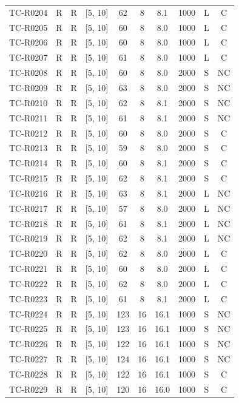 \begin{longtable}{lccccccccc}
TC-R0204 & R & R & [5, 10] & 62 & 8 & 8.1 & 1000 & L & C \\
TC-R0205 & R & R & [5, 10] & 60 & 8 & 8.0 & 1000 & L & C \\
TC-R0206 & R & R & [5, 10] & 60 & 8 & 8.0 & 1000 & L & C \\
TC-R0207 & R & R & [5, 10] & 61 & 8 & 8.0 & 1000 & L & C \\
TC-R0208 & R & R & [5, 10] & 60 & 8 & 8.0 & 2000 & S & NC \\
TC-R0209 & R & R & [5, 10] & 63 & 8 & 8.0 & 2000 & S & NC \\
TC-R0210 & R & R & [5, 10] & 62 & 8 & 8.1 & 2000 & S & NC \\
TC-R0211 & R & R & [5, 10] & 61 & 8 & 8.1 & 2000 & S & NC \\
TC-R0212 & R & R & [5, 10] & 60 & 8 & 8.0 & 2000 & S & C \\
TC-R0213 & R & R & [5, 10] & 59 & 8 & 8.0 & 2000 & S & C \\
TC-R0214 & R & R & [5, 10] & 60 & 8 & 8.1 & 2000 & S & C \\
TC-R0215 & R & R & [5, 10] & 62 & 8 & 8.1 & 2000 & S & C \\
TC-R0216 & R & R & [5, 10] & 63 & 8 & 8.1 & 2000 & L & NC \\
TC-R0217 & R & R & [5, 10] & 57 & 8 & 8.0 & 2000 & L & NC \\
TC-R0218 & R & R & [5, 10] & 61 & 8 & 8.1 & 2000 & L & NC \\
TC-R0219 & R & R & [5, 10] & 62 & 8 & 8.1 & 2000 & L & NC \\
TC-R0220 & R & R & [5, 10] & 62 & 8 & 8.0 & 2000 & L & C \\
TC-R0221 & R & R & [5, 10] & 60 & 8 & 8.0 & 2000 & L & C \\
TC-R0222 & R & R & [5, 10] & 62 & 8 & 8.0 & 2000 & L & C \\
TC-R0223 & R & R & [5, 10] & 61 & 8 & 8.1 & 2000 & L & C \\
TC-R0224 & R & R & [5, 10] & 123 & 16 & 16.1 & 1000 & S & NC \\
TC-R0225 & R & R & [5, 10] & 123 & 16 & 16.1 & 1000 & S & NC \\
TC-R0226 & R & R & [5, 10] & 122 & 16 & 16.1 & 1000 & S & NC \\
TC-R0227 & R & R & [5, 10] & 124 & 16 & 16.1 & 1000 & S & NC \\
TC-R0228 & R & R & [5, 10] & 122 & 16 & 16.1 & 1000 & S & C \\
TC-R0229 & R & R & [5, 10] & 120 & 16 & 16.0 & 1000 & S & C \\

\end{longtable}
